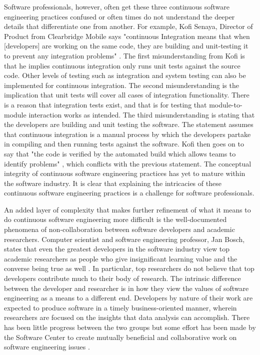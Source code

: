 \documentclass[12pt,a4paper]{article}
\begin{document}
Software professionals, however, often get these three continuous software engineering practices confused or often times do not understand the deeper details that differentiate one from another. For example, Kofi Senaya, Director of Product from Clearbridge Mobile says "continuous Integration means that when [developers] are working on the same code, they are building and unit-testing it to prevent any integration problems" \cite{stackify_2018}. The first misunderstanding from Kofi is that he implies continuous integration only runs unit tests against the source code. Other levels of testing such as integration and system testing can also be implemented for continuous integration. The second misunderstanding is the implication that unit tests will cover all cases of integration functionality. There is a reason that integration tests exist, and that is for testing that module-to-module interaction works as intended. The third misunderstanding is stating that the developers are building and unit testing the software. The statement assumes that continuous integration is a manual process by which the developers partake in compiling and then running tests against the software. Kofi then goes on to say that "the code is verified by the automated build which allows teams to identify problems" \cite{stackify_2018}, which conflicts with the previous statement. The conceptual integrity of continuous software engineering practices has yet to mature within the software industry. It is clear that explaining the intricacies of these continuous software engineering practices is a challenge for software professionals.

An added layer of complexity that makes further refinement of what it means to do continuous software engineering more difficult is the well-documented phenomena of non-collaboration between software developers and academic researchers. Computer scientist and software engineering professor, Jan Bosch, states that even the greatest developers in the software industry view top academic researchers as people who give insignificant learning value and the converse being true as well \cite[p. ~29]{bosch_2014}. In particular, top researchers do not believe that top developers contribute much to their body of research. The intrinsic difference between the developer and researcher is in how they view the values of software engineering as a means to a different end. Developers by nature of their work are expected to produce software in a timely business-oriented manner, wherein researchers are focused on the insights that data analysis can accomplish. There has been little progress between the two groups but some effort has been made by the Software Center to create mutually beneficial and collaborative work on software engineering issues \cite[p. ~31]{bosch_2014}.
\end{document}
